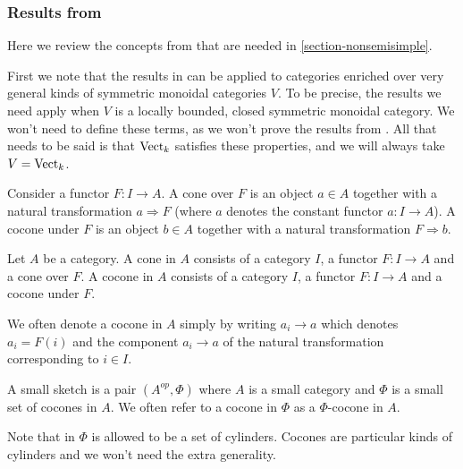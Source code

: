 \subsubsection{Results from \cite{kelly/basic-concepts-enriched}}\label{review_kelly}

Here we review the concepts from \cite{kelly/basic-concepts-enriched} that are
needed in \ref{section-nonsemisimple}.

First we note that the results in \cite{kelly/basic-concepts-enriched} can be
applied to categories enriched over very general kinds of symmetric monoidal
categories $V$. To be precise, the results we need apply when $V$ is a locally
bounded, closed symmetric monoidal category. We won't need to define these
terms, as we won't prove the results from
\cite{kelly/basic-concepts-enriched}. All that needs to be said is that
$\operatorname{Vect}_k$ satisfies these properties, and we will always take $V=\operatorname{Vect}_k$.

\begin{definition}

  \noindent Consider a functor $F:I\to A$. A cone over $F$ is an object $a\in
  A$ together with a natural transformation $a\Rightarrow F$ (where $a$
  denotes the constant functor $a:I\to A$). A cocone under $F$ is an object
  $b\in A$ together with a natural transformation $F\Rightarrow b$.
\end{definition}

\begin{definition}

  \noindent Let $A$ be a category. A cone in $A$ consists of a category $I$, a
  functor $F:I\to A$ and a cone over $F$. A cocone in $A$ consists of a
  category $I$, a functor $F:I\to A$ and a cocone under $F$.
\end{definition}

We often denote a cocone in $A$ simply by writing $a_i\to a$ which denotes
$a_i=F(i)$ and the component $a_i\to a$ of the natural transformation
corresponding to $i\in I$.


\begin{definition}

  \noindent A small sketch is a pair $(A^{op},\Phi)$ where $A$ is a small
  category and $\Phi$ is a small set of cocones in $A$. We often refer to a
  cocone in $\Phi$ as a $\Phi$-cocone in $A$.
\end{definition}

\begin{remark}
  Note that in \cite{kelly/basic-concepts-enriched} $\Phi$ is allowed to be a
  set of cylinders. Cocones are particular kinds of cylinders and we won't
  need the extra generality.
\end{remark}

